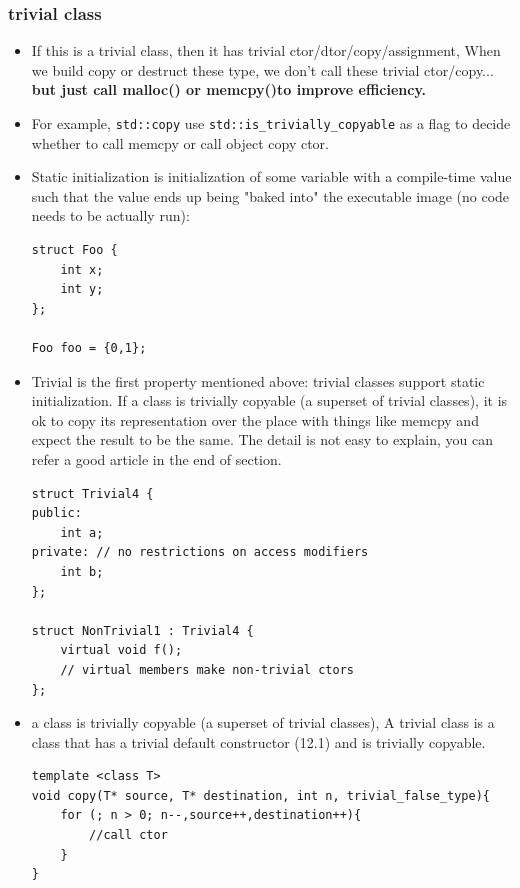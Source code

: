 \documentclass[a4paper,11pt,twoside]{book}
\begin{document}
\subsubsection{trivial class}
\begin{itemize}
	\item If this is a trivial class, then it has trivial ctor/dtor/copy/assignment, When we build copy or destruct these type, we don't call these trivial ctor/copy... \textbf{but just call malloc() or memcpy()to improve efficiency.}
	
	\item For example, \texttt{std::copy} use \texttt{std::is\_trivially\_copyable} as a flag to decide whether to call memcpy or call object copy ctor.
	
	\item Static initialization is initialization of some variable with a compile-time value such that the value ends up being "baked into" the executable image (no code needs to be actually run):
\begin{lstlisting}[numbers=none]
struct Foo {
	int x;
	int y;
};
	
Foo foo = {0,1};
\end{lstlisting}
	
	\item Trivial is the first property mentioned above: trivial classes support static initialization. If a class is trivially copyable (a superset of trivial classes), it is ok to copy its representation over the place with things like memcpy and expect the result to be the same. The detail is not easy to explain, you can refer a good article in the end of section. 
\begin{lstlisting}[numbers=none]
struct Trivial4 {
public:
	int a;
private: // no restrictions on access modifiers
	int b;
};

struct NonTrivial1 : Trivial4 {
	virtual void f(); 
	// virtual members make non-trivial ctors
};
\end{lstlisting}
	
	\item a class is trivially copyable (a superset of trivial classes), A trivial class is a class that has a trivial default constructor (12.1) and is trivially copyable.
	
\begin{lstlisting}[numbers=none]
template <class T> 
void copy(T* source, T* destination, int n, trivial_false_type){
	for (; n > 0; n--,source++,destination++){
		//call ctor
	}
}
	

\end{lstlisting}
\end{itemize}
\end{document}
